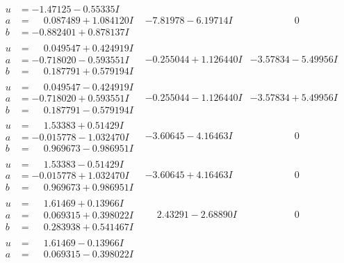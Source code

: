 \documentclass[1p]{elsarticle_modified}
\theoremstyle{definition}
\begin{document}
$$\begin{array}{c|c|c}
 \hline 
\begin{aligned}
u &= -1.47125 - 0.55335 I \\
a &= \phantom{-}0.087489 + 1.084120 I \\
b &= -0.882401 + 0.878137 I\end{aligned}
 & -7.81978 - 6.19714 I & \phantom{-0.000000 } 0 \\ \hline\begin{aligned}
u &= \phantom{-}0.049547 + 0.424919 I \\
a &= -0.718020 - 0.593551 I \\
b &= \phantom{-}0.187791 + 0.579194 I\end{aligned}
 & -0.255044 + 1.126440 I & -3.57834 - 5.49956 I \\ \hline\begin{aligned}
u &= \phantom{-}0.049547 - 0.424919 I \\
a &= -0.718020 + 0.593551 I \\
b &= \phantom{-}0.187791 - 0.579194 I\end{aligned}
 & -0.255044 - 1.126440 I & -3.57834 + 5.49956 I \\ \hline\begin{aligned}
u &= \phantom{-}1.53383 + 0.51429 I \\
a &= -0.015778 - 1.032470 I \\
b &= \phantom{-}0.969673 - 0.986951 I\end{aligned}
 & -3.60645 - 4.16463 I & \phantom{-0.000000 } 0 \\ \hline\begin{aligned}
u &= \phantom{-}1.53383 - 0.51429 I \\
a &= -0.015778 + 1.032470 I \\
b &= \phantom{-}0.969673 + 0.986951 I\end{aligned}
 & -3.60645 + 4.16463 I & \phantom{-0.000000 } 0 \\ \hline\begin{aligned}
u &= \phantom{-}1.61469 + 0.13966 I \\
a &= \phantom{-}0.069315 + 0.398022 I \\
b &= \phantom{-}0.283938 + 0.541467 I\end{aligned}
 & \phantom{-}2.43291 - 2.68890 I & \phantom{-0.000000 } 0 \\ \hline\begin{aligned}
u &= \phantom{-}1.61469 - 0.13966 I \\
a &= \phantom{-}0.069315 - 0.398022 I \\

\end{aligned}
\end{array}$$
\end{document}
